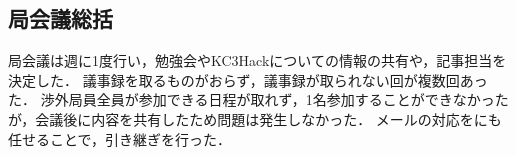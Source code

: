 \subsection*{局会議総括}


局会議は週に1度行い，勉強会やKC3Hackについての情報の共有や，記事担当を決定した．
議事録を取るものがおらず，議事録が取られない回が複数回あった．
渉外局員全員が参加できる日程が取れず，1名参加することができなかったが，会議後に内容を共有したため問題は発生しなかった．
メールの対応を\firstGrade{}にも任せることで，引き継ぎを行った．
